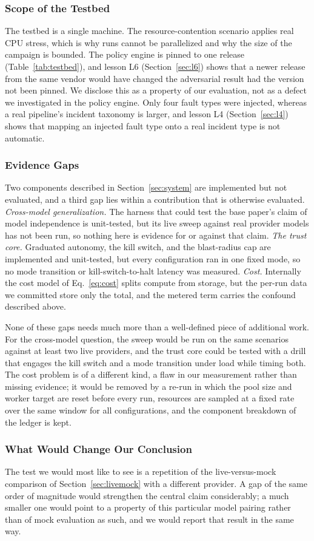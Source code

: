 \subsubsection{Scope of the Testbed}
The testbed is a single machine. The resource-contention scenario applies real CPU stress, which is
why runs cannot be parallelized and why the size of the campaign is bounded. The policy engine is
pinned to one release (Table~\ref{tab:testbed}), and lesson L6 (Section~\ref{sec:l6}) shows that a newer release from the
same vendor would have changed the adversarial result had the version not been pinned. We disclose
this as a property of our evaluation, not as a defect we investigated in the policy engine. Only four
fault types were injected, whereas a real pipeline's incident taxonomy is larger, and lesson L4
(Section~\ref{sec:l4}) shows that mapping an injected fault type onto a real incident type is not
automatic.

\subsubsection{Evidence Gaps}
Two components described in Section~\ref{sec:system} are implemented but not evaluated, and a third
gap lies within a contribution that is otherwise evaluated. \emph{Cross-model generalization.} The
harness that could test the base paper's claim of model independence is unit-tested, but its live
sweep against real provider models has not been run, so nothing here is evidence for or against that
claim. \emph{The trust core.} Graduated autonomy, the kill switch, and the blast-radius cap are
implemented and unit-tested, but every configuration ran in one fixed mode, so no mode transition or
kill-switch-to-halt latency was measured. \emph{Cost.} Internally the cost model of Eq.~\eqref{eq:cost} splits compute from
storage, but the per-run data we committed store only the total, and the metered term carries the
confound described above.

None of these gaps needs much more than a well-defined piece of additional work. For the cross-model
question, the sweep would be run on the same scenarios against at least two live providers, and the
trust core could be tested with a drill that engages the kill switch and a mode transition under load
while timing both. The cost problem is of a different kind, a flaw in our measurement rather than
missing evidence; it would be removed by a re-run in which the pool size and worker target are reset
before every run, resources are sampled at a fixed rate over the same window for all configurations,
and the component breakdown of the ledger is kept.

\subsubsection{What Would Change Our Conclusion}
The test we would most like to see is a repetition of the live-versus-mock comparison of
Section~\ref{sec:livemock} with a different provider. A gap of the same order of magnitude would
strengthen the central claim considerably; a much smaller one would point to a property of this
particular model pairing rather than of mock evaluation as such, and we would report that result in
the same way.
